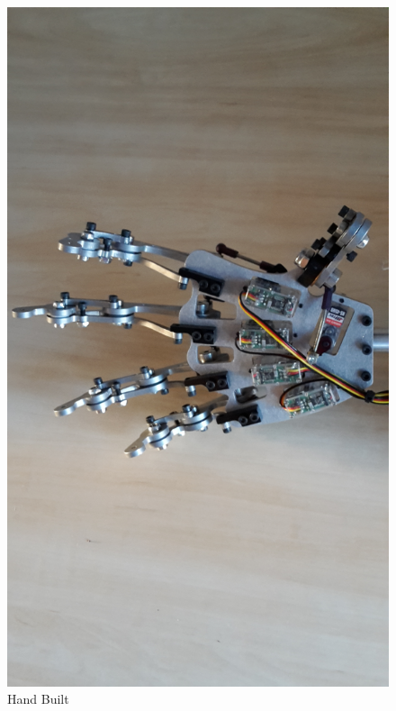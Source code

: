 \documentclass[progress]{cmpreport}
\begin{document}
{{{{{{\begin{figure}[H]
\begin{minipage}{0.455\textwidth}
	\end{minipage}
	\hfill
	\begin{minipage}{0.455\textwidth}
		\caption{Hand Built}
		\includegraphics[width=1\textwidth, angle=-90]{photos/Day10.jpg}
	\end{minipage}
\end{figure}

}}}}}}
\end{document}
